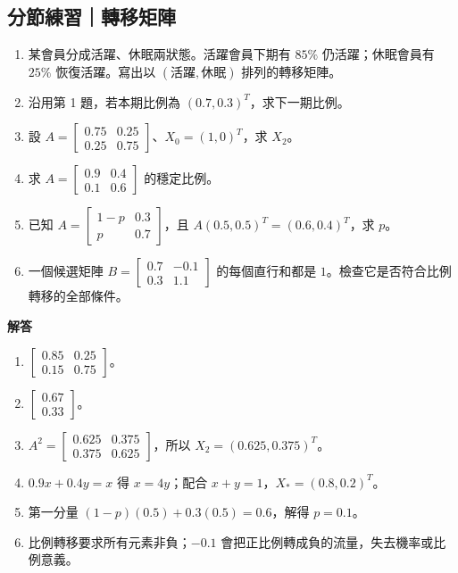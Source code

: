 \documentclass[11pt,a4paper]{article}
\providecommand{\tightlist}{%
  \setlength{\itemsep}{0pt}\setlength{\parskip}{0pt}}
\begin{document}
\begin{HandoutSelfCheck}

\subsection{分節練習｜轉移矩陣}\label{ux5206ux7bc0ux7df4ux7fd2ux8f49ux79fbux77e9ux9663}

\begin{enumerate}
\def\labelenumi{\arabic{enumi}.}
\tightlist
\item
  某會員分成活躍、休眠兩狀態。活躍會員下期有 \(85\%\) 仍活躍；休眠會員有 \(25\%\) 恢復活躍。寫出以 \((\text{活躍},\text{休眠})\) 排列的轉移矩陣。
\item
  沿用第 1 題，若本期比例為 \((0.7,0.3)^T\)，求下一期比例。
\item
  設 \(A=\begin{bmatrix}0.75&0.25\\0.25&0.75\end{bmatrix}\)、\(X_0=(1,0)^T\)，求 \(X_2\)。
\item
  求 \(A=\begin{bmatrix}0.9&0.4\\0.1&0.6\end{bmatrix}\) 的穩定比例。
\item
  已知 \(A=\begin{bmatrix}1-p&0.3\\p&0.7\end{bmatrix}\)，且 \(A(0.5,0.5)^T=(0.6,0.4)^T\)，求 \(p\)。
\item
  一個候選矩陣 \(B=\begin{bmatrix}0.7&-0.1\\0.3&1.1\end{bmatrix}\) 的每個直行和都是 \(1\)。檢查它是否符合比例轉移的全部條件。
\end{enumerate}

\textbf{解答}

\begin{enumerate}
\def\labelenumi{\arabic{enumi}.}
\tightlist
\item
  \(\boxed{\begin{bmatrix}0.85&0.25\\0.15&0.75\end{bmatrix}}\)。
\item
  \(\boxed{\begin{bmatrix}0.67\\0.33\end{bmatrix}}\)。
\item
  \(A^2=\begin{bmatrix}0.625&0.375\\0.375&0.625\end{bmatrix}\)，所以 \(\boxed{X_2=(0.625,0.375)^T}\)。
\item
  \(0.9x+0.4y=x\) 得 \(x=4y\)；配合 \(x+y=1\)，\(\boxed{X_*=(0.8,0.2)^T}\)。
\item
  第一分量 \((1-p)(0.5)+0.3(0.5)=0.6\)，解得 \(\boxed{p=0.1}\)。
\item
  比例轉移要求所有元素非負；\(-0.1\) 會把正比例轉成負的流量，失去機率或比例意義。
\end{enumerate}

\end{HandoutSelfCheck}
\end{document}

